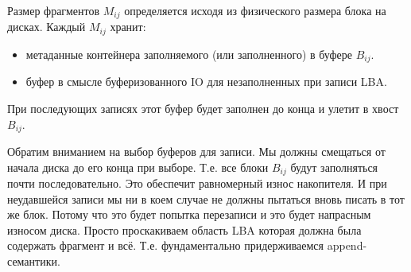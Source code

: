\documentclass[a4paper,12pt]{article}
\begin{document}
\begin{center}
\end{center}
Размер фрагментов $M_{ij}$ определяется исходя из физического размера блока на дисках.
Каждый $M_{ij}$ хранит:

\begin{itemize}
    \item метаданные контейнера заполняемого (или заполненного) в буфере $B_{ij}$.
    \item буфер в смысле буферизованного IO для незаполненных при записи LBA.
\end{itemize}
При последующих записях этот буфер будет заполнен до конца и улетит в хвост $B_{ij}$.

Обратим вниманием на выбор буферов для записи. Мы должны смещаться от начала диска до его конца при выборе. Т.е. все блоки $B_{ij}$ будут заполняться почти последовательно. Это обеспечит
равномерный износ накопителя. И при неудавшейся записи мы ни в коем случае не должны пытаться вновь писать в тот же блок. Потому что это будет попытка перезаписи и это будет напрасным
износом диска. Просто проскакиваем область LBA которая должна была содержать фрагмент и всё. Т.е. фундаментально придерживаемся append-семантики.
\end{document}
